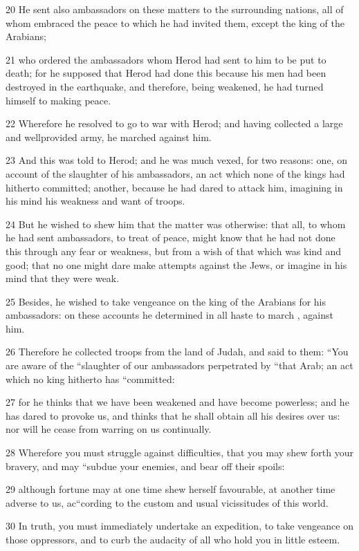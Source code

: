 20 He sent also ambassadors on these matters to the surrounding nations, all of whom embraced the peace to which he had invited them, except the king of the Arabians; 

21 who ordered the ambassadors whom Herod had sent to him to be put to death; for he supposed that Herod had done this because his men had been destroyed in the earthquake, and therefore, being weakened, he had turned himself to making peace. 

22 Wherefore he resolved to go to war with Herod; and having collected a large and wellprovided army, he marched against him. 

23 And this was told to Herod; and he was much vexed, for two reasons: one, on account of the slaughter of his ambassadors, an act which none of the kings had hitherto committed; another, because he had dared to attack him, imagining in his mind his weakness and want of troops. 

24 But he wished to shew him that the matter was otherwise: that all, to whom he had sent ambassadors, to treat of peace, might know that he had not done this through any fear or weakness, but from a wish of that which was kind and good; that no one might dare make attempts against the Jews, or imagine in his mind that they were weak. 

25 Besides, he wished to take vengeance on the king of the Arabians for his ambassadors: on these accounts he determined in all haste to march , against him. 

26 Therefore he collected troops from the land of Judah, and said to them: “You are aware of the “slaughter of our ambassadors perpetrated by “that Arab; an act which no king hitherto has “committed: 

27 for he thinks that we have been weakened and have become powerless; and he has dared to provoke us, and thinks that he shall obtain all his desires over us: nor will he cease from warring on us continually. 

28 Wherefore you must struggle against difficulties, that you may shew forth your bravery, and may “subdue your enemies, and bear off their spoils: 

29 although fortune may at one time shew herself favourable, at another time adverse to us, ac“cording to the custom and usual vicissitudes of this world. 

30 In truth, you must immediately undertake an expedition, to take vengeance on those oppressors, and to curb the audacity of all who hold you in little esteem. 


